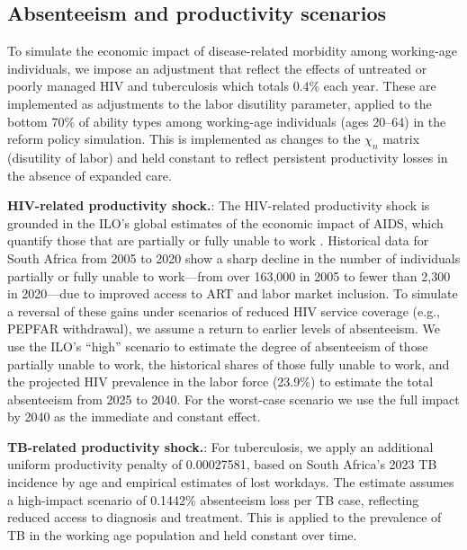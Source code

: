 \documentclass[letterpaper,12pt]{article}
\theoremstyle{definition}
\begin{document}
\begin{spacing}{1.5}
\subsection{Absenteeism and productivity scenarios}
To simulate the economic impact of disease-related morbidity among working-age individuals, we impose an adjustment that reflect the effects of untreated or poorly managed HIV and tuberculosis which totals 0.4\% each year. These are implemented as adjustments to the labor disutility parameter, applied to the bottom 70\% of ability types among working-age individuals (ages 20–64) in the reform policy simulation. This is implemented as changes to the $\chi_n$ matrix (disutility of labor) and held constant to reflect persistent productivity losses in the absence of expanded care.

\textbf{HIV-related productivity shock.}: The HIV-related productivity shock is grounded in the ILO’s global estimates of the economic impact of AIDS, which quantify those that are partially or fully unable to work \citet{ILO2018}. Historical data for South Africa from 2005 to 2020 show a sharp decline in the number of individuals partially or fully unable to work—from over 163,000 in 2005 to fewer than 2,300 in 2020—due to improved access to ART and labor market inclusion. To simulate a reversal of these gains under scenarios of reduced HIV service coverage (e.g., PEPFAR withdrawal), we assume a return to earlier levels of absenteeism. We use the ILO’s “high” scenario to estimate the degree of absenteeism of those partially unable to work, the historical shares of those fully unable to work, and the projected HIV prevalence in the labor force (23.9\%) to estimate the total absenteeism from 2025 to 2040. For the worst-case scenario we use the full impact by 2040 as the immediate and constant effect.

\textbf{TB-related productivity shock.}: For tuberculosis, we apply an additional uniform productivity penalty of 0.00027581, based on South Africa’s 2023 TB incidence by age and empirical estimates of lost workdays. The estimate assumes a high-impact scenario of 0.1442\% absenteeism loss per TB case, reflecting reduced access to diagnosis and treatment. This is applied to the prevalence of TB in the working age population and held constant over time.




\end{spacing}
\end{document}
